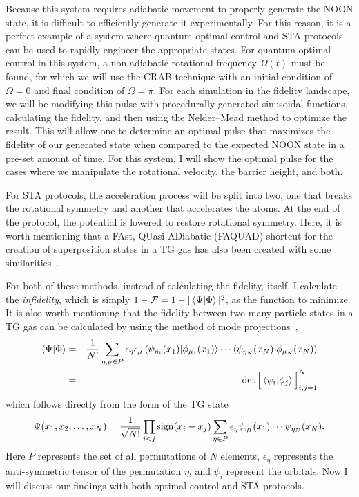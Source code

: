Because this system requires adiabatic movement to properly generate the NOON state, it is difficult to efficiently generate it experimentally.
For this reason, it is a perfect example of a system where quantum optimal control and STA protocols can be used to rapidly engineer the appropriate states.
For quantum optimal control in this system, a non-adiabatic rotational frequency $\Omega(t)$ must be found, for which we will use the CRAB technique with an initial condition of $\Omega = 0$ and final condition of $\Omega = \pi$.
For each simulation in the fidelity landscape, we will be modifying this pulse with procedurally generated sinusoidal functions, calculating the fidelity, and then using the Nelder--Mead method to optimize the result.
This will allow one to determine an optimal pulse that maximizes the fidelity of our generated state when compared to the expected NOON state in a pre-set amount of time.
For this system, I will show the optimal pulse for the cases where we manipulate the rotational velocity, the barrier height, and both.

For STA protocols, the acceleration process will be split into two, one that breaks the rotational symmetry and another that accelerates the atoms.
At the end of the protocol, the potential is lowered to restore rotational symmetry.
Here, it is worth mentioning that a FAst, QUasi-ADiabatic (FAQUAD) shortcut for the creation of superposition states in a TG gas has also been created with some similarities~\cite{garaot2015}.

For both of these methods, instead of calculating the fidelity, itself, I calculate the \textit{infidelity}, which is simply $1-\mathcal{F} = 1-|\braket{\Psi|\Phi}|^2$, as the function to minimize.
It is also worth mentioning that the fidelity between two many-particle states in a TG gas can be calculated by using the method of mode projections~\cite{campo2011,lelas2011},
\begin{eqnarray}
\braket{\Psi | \Phi} &=& \frac1{N!} \sum_{\eta, \mu \in P} \epsilon_\eta \epsilon_\mu \braket{\psi_{\eta_1}(x_1) | \phi_{\mu_1}(x_1) } \cdots \braket{ \psi_{\eta_N}(x_N) | \phi_{\mu_N}(x_N) } \nonumber \\
\label{eq:fid}
&=&
\det \Big[ \braket{\psi_i | \phi_j }\Big]_{i,j=1}^N
\end{eqnarray}
which follows directly from the form of the TG state~\cite{girardeau1960}
\begin{equation}
\Psi(x_1,x_2,\ldots, x_N)= \frac1{\sqrt{N!}} \prod_{i<j}\textnormal{sign}(x_i-x_j) \sum_{\eta \in P} \epsilon_\eta \psi_{\eta_1}(x_1)\cdots\psi_{\eta_N}(x_N).
\label{eq:TG}
\end{equation}
Here $P$ represents the set of all permutations of $N$ elements, $\epsilon_\eta$ represents the anti-symmetric tensor of the permutation $\eta$, and $\psi_i$ represent the orbitals.
Now I will discuss our findings with both optimal control and STA protocols.


